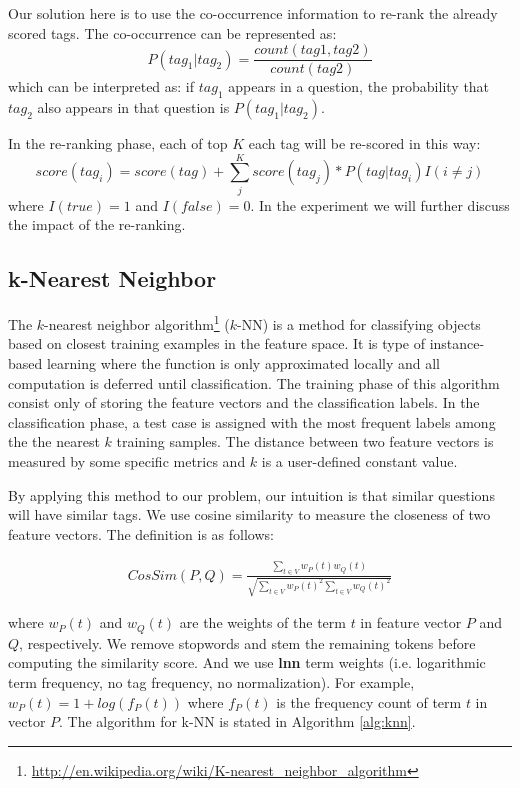 Our solution here is to use the co-occurrence information to re-rank the already scored tags. The co-occurrence can be represented as:
    $$ P(tag_1|tag_2) = \frac{count(tag1, tag2)}{count(tag2)} $$
which can be interpreted as: if $tag_1$ appears in a question, the probability that $tag_2$ also appears in that question is $P(tag_1|tag_2)$. 

In the re-ranking phase, each of top $K$ each tag will be re-scored in this way:
    $$ score(tag_i) = score(tag) + \sum_j^K score(tag_j) * P(tag|tag_i) I(i \ne j)$$
where $I(true) = 1$ and $I(false) = 0$. In the experiment we will further discuss the impact of the re-ranking.

\subsection{k-Nearest Neighbor}

The $k$-nearest neighbor algorithm\footnote{\url{http://en.wikipedia.org/wiki/K-nearest\_neighbor\_algorithm}} ($k$-NN) is a method for classifying objects based on closest training examples in the feature space. It is type of instance-based learning where the function is only approximated locally and all computation is deferred until classification. The training phase of this algorithm consist only of storing the feature vectors and the classification labels. In the classification phase, a test case is assigned with the most frequent labels among the the nearest $k$ training samples. The distance between two feature vectors is measured by some specific metrics and $k$ is a user-defined constant value.

By applying this method to our problem, our intuition is that similar questions will have similar tags. We use cosine similarity to measure the closeness of two feature vectors. The definition is as follows:

\begin{gather}
	CosSim(P,Q)=\frac{\sum_{t \in V}w_P(t)w_Q(t)}{\sqrt{\sum_{t \in V}w_P(t)^2 \sum_{t \in V}w_Q(t)^2}}
\end{gather}

where $w_P(t)$ and $w_Q(t)$ are the weights of the term $t$ in feature vector $P$ and $Q$, respectively. We remove stopwords and stem the remaining tokens before computing the similarity score. And we use \textbf{lnn} term weights (i.e. logarithmic term frequency, no tag frequency, no normalization). For example, $w_P(t) = 1 + log(f_P(t))$ where $f_P(t)$ is the frequency count of term $t$ in vector $P$. The algorithm for k-NN is stated in Algorithm \ref{alg:knn}.

